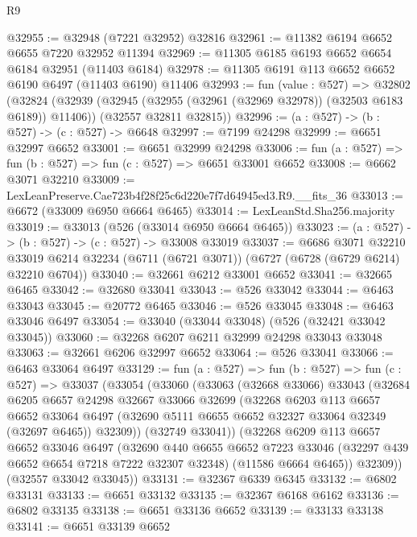 \begin{lexlean}{R9}
\begin{coremodule}
@32955 := @32948 (@7221 @32952) @32816
@32961 := @11382 @6194 @6652 @6655 @7220 @32952 @11394
@32969 := @11305 @6185 @6193 @6652 @6654 @6184 @32951 (@11403 @6184)
@32978 := @11305 @6191 @113 @6652 @6652 @6190 @6497 (@11403 @6190) @11406
@32993 := fun (value : @527) =>
  @32802
    (@32824
      (@32939 (@32945 (@32955 (@32961 (@32969 @32978)) (@32503 @6183 @6189)) @11406))
      (@32557 @32811 @32815))
@32996 := (a : @527) -> (b : @527) -> (c : @527) -> @6648
@32997 := @7199 @24298
@32999 := @6651 @32997 @6652
@33001 := @6651 @32999 @24298
@33006 := fun (a : @527) => fun (b : @527) => fun (c : @527) => @6651 @33001 @6652
@33008 := @6662 @3071 @32210
@33009 := LexLeanPreserve.Cae723b4f28f25c6d220e7f7d64945ed3.R9.__fits_36
@33013 := @6672 (@33009 @6950 @6664 @6465)
@33014 := LexLeanStd.Sha256.majority
@33019 := @33013 (@526 (@33014 @6950 @6664 @6465))
@33023 := (a : @527) -> (b : @527) -> (c : @527) -> @33008 @33019
@33037 := @6686
    @3071
    @32210
    @33019
    @6214
    @32234
    (@6711 (@6721 @3071))
    (@6727 (@6728 (@6729 @6214) @32210 @6704))
@33040 := @32661 @6212 @33001 @6652
@33041 := @32665 @6465
@33042 := @32680 @33041
@33043 := @526 @33042
@33044 := @6463 @33043
@33045 := @20772 @6465
@33046 := @526 @33045
@33048 := @6463 @33046 @6497
@33054 := @33040 (@33044 @33048) (@526 (@32421 @33042 @33045))
@33060 := @32268 @6207 @6211 @32999 @24298 @33043 @33048
@33063 := @32661 @6206 @32997 @6652
@33064 := @526 @33041
@33066 := @6463 @33064 @6497
@33129 := fun (a : @527) =>
  fun (b : @527) =>
  fun (c : @527) =>
  @33037
    (@33054
      (@33060
        (@33063
          (@32668 @33066)
          @33043
          (@32684
            @6205
            @6657
            @24298
            @32667
            @33066
            @32699
            (@32268
              @6203
              @113
              @6657
              @6652
              @33064
              @6497
              (@32690 @5111 @6655 @6652 @32327 @33064 @32349 (@32697 @6465))
              @32309))
          (@32749 @33041))
        (@32268
          @6209
          @113
          @6657
          @6652
          @33046
          @6497
          (@32690
            @440
            @6655
            @6652
            @7223
            @33046
            (@32297 @439 @6652 @6654 @7218 @7222 @32307 @32348)
            (@11586 @6664 @6465))
          @32309))
      (@32557 @33042 @33045))
@33131 := @32367 @6339 @6345
@33132 := @6802 @33131
@33133 := @6651 @33132
@33135 := @32367 @6168 @6162
@33136 := @6802 @33135
@33138 := @6651 @33136 @6652
@33139 := @33133 @33138
@33141 := @6651 @33139 @6652

\end{coremodule}
\end{lexlean}
